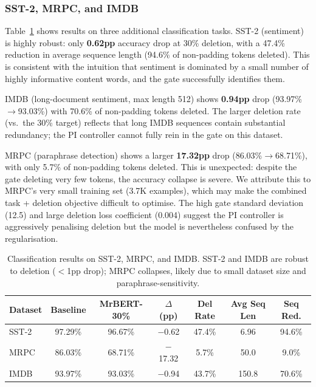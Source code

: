 \documentclass[11pt,a4paper]{article}
\begin{document}
\subsubsection{SST-2, MRPC, and IMDB}
\label{sec:results-classification}

Table~\ref{tab:classification-results} shows results on three additional classification tasks. SST-2 (sentiment) is highly robust: only \textbf{0.62pp} accuracy drop at 30\% deletion, with a 47.4\% reduction in average sequence length (94.6\% of non-padding tokens deleted). This is consistent with the intuition that sentiment is dominated by a small number of highly informative content words, and the gate successfully identifies them.

IMDB (long-document sentiment, max length 512) shows \textbf{0.94pp} drop (93.97\%$\to$93.03\%) with 70.6\% of non-padding tokens deleted. The larger deletion rate (vs.\ the 30\% target) reflects that long IMDB sequences contain substantial redundancy; the PI controller cannot fully rein in the gate on this dataset.

MRPC (paraphrase detection) shows a larger \textbf{17.32pp} drop (86.03\%$\to$68.71\%), with only 5.7\% of non-padding tokens deleted. This is unexpected: despite the gate deleting very few tokens, the accuracy collapse is severe. We attribute this to MRPC's very small training set (3.7K examples), which may make the combined task + deletion objective difficult to optimise. The high gate standard deviation (12.5) and large deletion loss coefficient (0.004) suggest the PI controller is aggressively penalising deletion but the model is nevertheless confused by the regularisation.

\begin{table}[h]
\centering
\begin{tabular}{@{}lcccccc@{}}
\toprule
\textbf{Dataset} & \textbf{Baseline} & \textbf{MrBERT-30\%} & \textbf{$\Delta$ (pp)} & \textbf{Del Rate} & \textbf{Avg Seq Len} & \textbf{Seq Red.} \\
\midrule
SST-2 & 97.29\% & 96.67\% & $-$0.62 & 47.4\%  & 6.96  & 94.6\% \\
MRPC  & 86.03\% & 68.71\% & $-$17.32 & 5.7\%   & 50.0  & 9.0\%  \\
IMDB  & 93.97\% & 93.03\% & $-$0.94 & 43.7\%  & 150.8 & 70.6\% \\
\bottomrule
\end{tabular}
\caption{Classification results on SST-2, MRPC, and IMDB. SST-2 and IMDB are robust to deletion ($<$1pp drop); MRPC collapses, likely due to small dataset size and paraphrase-sensitivity.}
\label{tab:classification-results}
\end{table}
\end{document}
